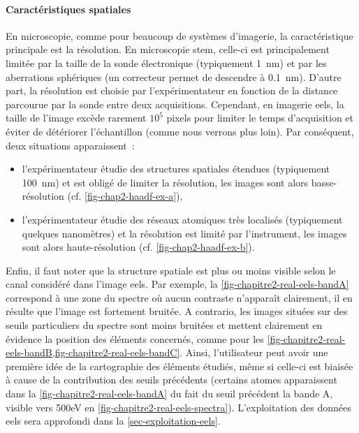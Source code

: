     \paragraph*{Caractéristiques spatiales} En microscopie, comme pour beaucoup de systèmes d'imagerie, la caractéristique principale est la résolution. En microscopie \gls{stem}, celle-ci est principalement limitée par la taille de la sonde électronique (typiquement 1~nm) et par les aberrations sphériques (un correcteur permet de descendre à 0.1~nm). D'autre part, la résolution est choisie par l'expérimentateur en fonction de la distance parcourue par la sonde entre deux acquisitions. Cependant, en imagerie \gls{eels}, la taille de l'image excède rarement $10^5$ pixels pour limiter le temps d'acquisition et éviter de détériorer l'échantillon (comme nous verrons plus loin). Par conséquent, deux situations apparaissent~:
    \begin{itemize}
        \item l'expérimentateur étudie des structures spatiales étendues (typiquement 100~nm) et est obligé de limiter la résolution, les images sont alors basse-résolution (cf. \cref{fig-chap2-haadf-ex-a}),
        \item l'expérimentateur étudie des réseaux atomiques très localisés (typiquement quelques nanomètres) et la résolution est limité par l'instrument, les images sont alors haute-résolution (cf. \cref{fig-chap2-haadf-ex-b}).
    \end{itemize}
    Enfin, il faut noter que la structure spatiale est plus ou moins visible selon le canal considéré dans l'image \gls{eels}. Par exemple, la \cref{fig-chapitre2-real-eels-bandA} correspond à une zone du spectre où aucun contraste n'apparaît clairement, il en résulte que l'image est fortement bruitée. A contrario, les images situées sur des seuils particuliers du spectre sont moins bruitées et mettent clairement en évidence la position des éléments concernés, comme pour les \cref{fig-chapitre2-real-eels-bandB,fig-chapitre2-real-eels-bandC}. Ainsi, l'utilisateur peut avoir une première idée de la cartographie des éléments étudiés, même si celle-ci est biaisée à cause de la contribution des seuils précédents (certains atomes apparaissent dans la \cref{fig-chapitre2-real-eels-bandA} du fait du seuil précédent la bande A, visible vers 500eV en \cref{fig-chapitre2-real-eels-spectra}). L'exploitation des données \gls{eels} sera approfondi dans la \cref{sec-exploitation-eels}.

